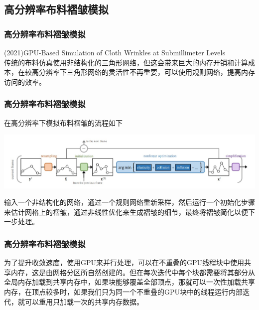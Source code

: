 \documentclass[aspectratio=43]{ctexbeamer}
\begin{document}
\subsection{高分辨率布料褶皱模拟}
\begin{frame}
  \frametitle{高分辨率布料褶皱模拟}
	(2021)GPU-Based Simulation of Cloth Wrinkles at Submillimeter Levels\\[10pt]

		传统的布料仿真使用非结构化的三角形网络，但这会带来巨大的内存开销和计算成本，在较高分辨率下三角形网络的灵活性不再重要，可以使用规则网络，提高内存访问的效率。
		
\end{frame}

\begin{frame}
  \frametitle{高分辨率布料褶皱模拟}
		在高分辨率下模拟布料褶皱的流程如下
        \begin{center}
            \includegraphics[width=1.0\linewidth]{./fig/褶皱模拟流程.jpg}
        \end{center}
		输入一个非结构化的网络，通过一个规则网络重新采样，然后运行一个初始化步骤来估计网格上的褶皱，通过非线性优化来生成褶皱的细节，最终将褶皱简化以便下一步处理。
\end{frame}

\begin{frame}
  \frametitle{高分辨率布料褶皱模拟}
		\; \;为了提升收敛速度，使用GPU来并行处理，可以在不重叠的GPU线程块中使用共享内存，这是由网格分区所自然创建的。但在每次迭代中每个块都需要将其部分从全局内存加载到共享内存中，如果块能够覆盖全部顶点，那就可以一次性加载共享内存，在顶点较多时，如果我们只为同一个不重叠的GPU块中的线程运行内部迭代，就可以重用只加载一次的共享内存数据。
\end{frame}
\end{document}
